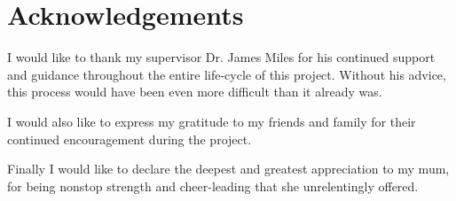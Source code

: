 \chapter*{Acknowledgements}
I would like to thank my supervisor Dr. James Miles for his continued support and guidance throughout the entire life-cycle of this project. Without his advice, this process would have been even more difficult than it already was.

I would also like to express my gratitude to my friends and family for their continued encouragement during the project.

Finally I would like to declare the deepest and greatest appreciation to my mum, for being nonstop strength and cheer-leading that she unrelentingly offered. 